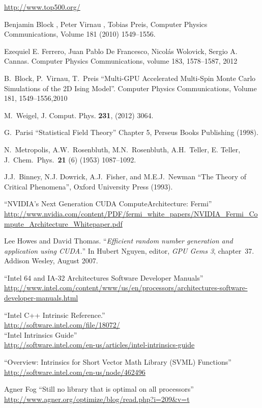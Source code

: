 \documentclass[a4paper]{llncs}
\begin{document}
\begin{thebibliography}{9}

 \url{http://www.top500.org/}

 Benjamin Block , Peter Virnau , Tobias Preis, Computer Physics
Communications, Volume 181 (2010) 1549–1556.

 Ezequiel E. Ferrero, Juan Pablo De Francesco, Nicolás Wolovick,
Sergio A. Cannas. Computer Physics Communications, volume 183, 1578--1587, 2012

B.~Block, P.~Virnau, T.~Preis ``Multi-GPU Accelerated
Multi-Spin Monte Carlo Simulations of the 2D Ising Model''. Computer Physics
Communications, Volume 181, 1549--1556,2010

 M.~Weigel, J. Comput. Phys. \textbf{231},  (2012) 3064.

 G.~Parisi ``Statistical Field Theory'' Chapter 5, Perseus
Books Publishing (1998).

 N.~Metropolis, A.W.~Rosenbluth, M.N.~Rosenbluth,
A.H.~Teller, E. Teller, J.~Chem.~Phys.~\textbf{21} (6) (1953) 1087--1092.

 J.J.~Binney, N.J. Dowrick, A.J.~Fisher, and M.E.J.~Newman
``The Theory of Critical Phenomena'', Oxford University Press (1993).

 ``NVIDIA's Next Generation CUDA ComputeArchitecture: Fermi'' \\
\url{http://www.nvidia.com/content/PDF/fermi_white_papers/NVIDIA_Fermi_Compute_Architecture_Whitepaper.pdf}

 Lee Howes and David Thomas. ``{\em Efficient random
number generation and application using {CUDA}.}'' In Hubert Nguyen, editor,
{\em GPU Gems 3}, chapter~37. Addison Wesley, August 2007.

 ``Intel 64 and IA-32 Architectures Software Developer Manuals''
\\
\url{http://www.intel.com/content/www/us/en/processors/architectures-software-developer-manuals.html}

 ``Intel C++ Intrinsic Reference.'' \\
\url{http://software.intel.com/file/18072/} \\
``Intel Intrinsics Guide'' \\
\url{http://software.intel.com/en-us/articles/intel-intrinsics-guide}

 ``Overview: Intrinsics for Short Vector Math Library (SVML)
Functions'' \\ \url{http://software.intel.com/en-us/node/462496}

 Agner Fog ``Still no library that is optimal on all
processors'' \\ \url{http://www.agner.org/optimize/blog/read.php?i=209&v=t}

\end{thebibliography}
\end{document}
